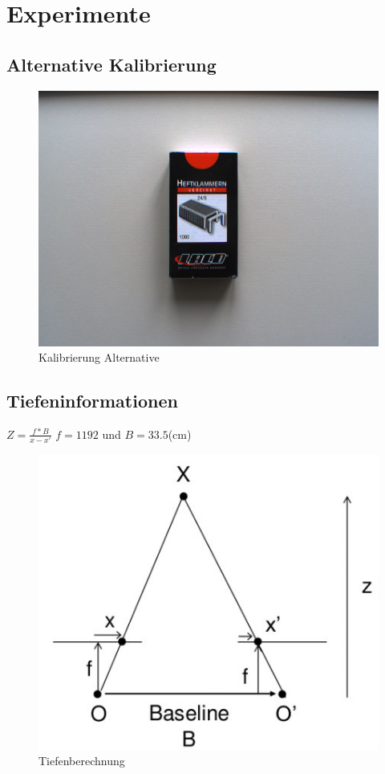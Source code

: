 \chapter{Experimente}
\label{cha:experimente}

\section{Alternative Kalibrierung}
\label{sec:alternativekalibrierung}

\begin{figure}[H]
	\includegraphics[scale=1.0]{bilder/experimentcalib}
	\caption[Kalibrierung Alternative]{Kalibrierung Alternative}
\end{figure}

\section{Tiefeninformationen}
\label{sec:expiefeninformationen2}

$Z=\frac{f*B}{x-x'}$
$f=1192$ und $B=33.5$(cm)

\begin{figure}[H]
	\includegraphics[scale=1.0]{bilder/tiefenberechnung}
	\caption[Tiefenberechnung]{Tiefenberechnung}
\end{figure}

